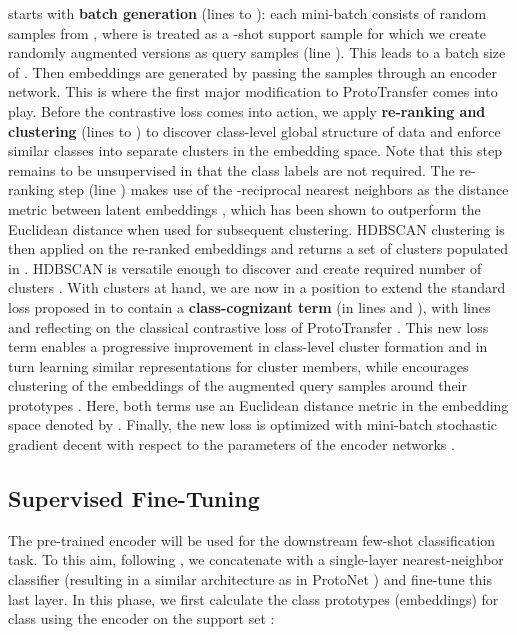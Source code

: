 \documentclass{article}
\begin{document}
 starts with \textbf{batch generation} (lines  to ): each mini-batch consists of  random samples  from , where  is treated as a -shot support sample for which we create  randomly augmented versions  as query samples (line ). This leads to a batch size of . Then embeddings are generated by passing the samples through an encoder  network. This is where the first major modification to ProtoTransfer \citep{Medina2020Self-SupervisedClassification} comes into play. Before the contrastive loss comes into action, we apply \textbf{re-ranking and clustering} (lines  to ) to discover class-level global structure of data and enforce similar classes into separate clusters in the embedding space. Note that this step remains to be unsupervised in that the class labels are not required. The re-ranking step (line ) makes use of the -reciprocal nearest neighbors as the distance metric between latent embeddings \citep{ZhongRe-rankingEncoding}, which has been shown to outperform the Euclidean distance \citep{Ji2019UnsupervisedTraining} when used for subsequent clustering.  
HDBSCAN clustering \citep{McInnes2017Hdbscan:Clustering} is then applied on the re-ranked embeddings  and returns a set of clusters populated in . HDBSCAN is versatile enough to discover and create required number of clusters . With clusters at hand, we are now in a position to extend the standard loss proposed in \citep{Medina2020Self-SupervisedClassification} to contain a \textbf{class-cognizant term} (in lines  and ), with lines  and  reflecting on the classical contrastive loss of ProtoTransfer \citep{Medina2020Self-SupervisedClassification}. This new loss term  enables a progressive improvement in class-level cluster formation and in turn learning similar representations for cluster members, while  encourages clustering of the embeddings of the augmented query samples  around their prototypes . Here, both terms use an Euclidean distance metric in the embedding space denoted by . Finally, the new loss  is optimized with mini-batch stochastic gradient decent with respect to the parameters  of the encoder networks .

\subsection{Supervised Fine-Tuning}
\label{ssec:fine-tuning}
The pre-trained encoder  will be used for the downstream few-shot classification task. To this aim, following \citep{Medina2020Self-SupervisedClassification, Snell2017PrototypicalLearning}, we concatenate  with a single-layer nearest-neighbor classifier  (resulting in a similar architecture as in ProtoNet \citep{Snell2017PrototypicalLearning}) and fine-tune this last layer. In this phase, we first calculate the class prototypes  (embeddings) for class  using the encoder  on the support set :
\end{document}
